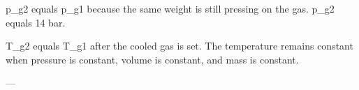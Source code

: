 p_g2 equals p_g1 because the same weight is still pressing on the gas.  
p_g2 equals 14 bar.  

T_g2 equals T_g1 after the cooled gas is set.  
The temperature remains constant when pressure is constant, volume is constant, and mass is constant.  

---